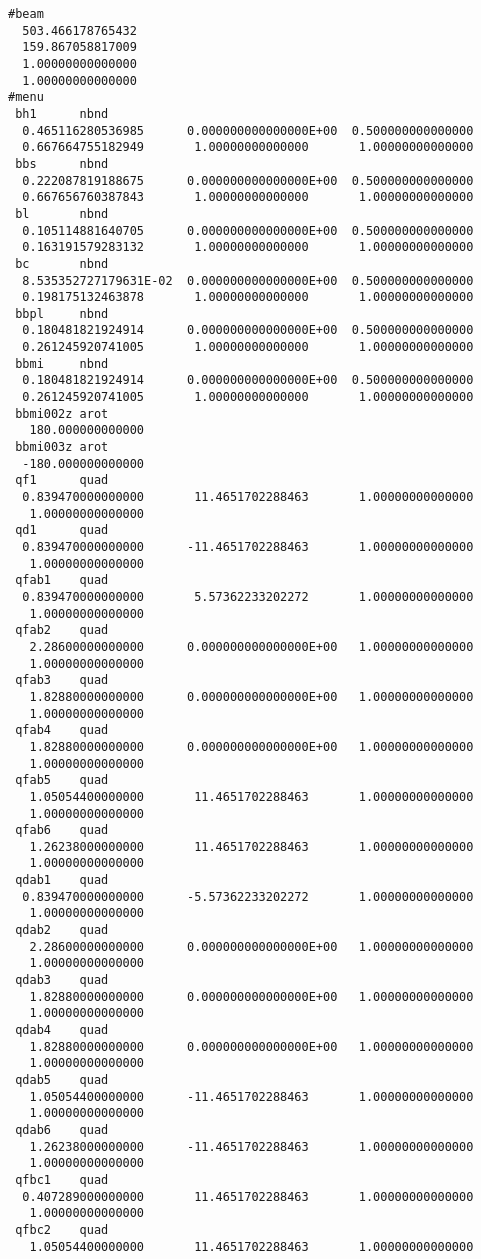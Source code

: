 \begin{footnotesize}
\begin{verbatim}
#beam
  503.466178765432
  159.867058817009
  1.00000000000000
  1.00000000000000
#menu
 bh1      nbnd
  0.465116280536985      0.000000000000000E+00  0.500000000000000
  0.667664755182949       1.00000000000000       1.00000000000000
 bbs      nbnd
  0.222087819188675      0.000000000000000E+00  0.500000000000000
  0.667656760387843       1.00000000000000       1.00000000000000
 bl       nbnd
  0.105114881640705      0.000000000000000E+00  0.500000000000000
  0.163191579283132       1.00000000000000       1.00000000000000
 bc       nbnd
  8.535352727179631E-02  0.000000000000000E+00  0.500000000000000
  0.198175132463878       1.00000000000000       1.00000000000000
 bbpl     nbnd
  0.180481821924914      0.000000000000000E+00  0.500000000000000
  0.261245920741005       1.00000000000000       1.00000000000000
 bbmi     nbnd
  0.180481821924914      0.000000000000000E+00  0.500000000000000
  0.261245920741005       1.00000000000000       1.00000000000000
 bbmi002z arot
   180.000000000000
 bbmi003z arot
  -180.000000000000
 qf1      quad
  0.839470000000000       11.4651702288463       1.00000000000000
   1.00000000000000
 qd1      quad
  0.839470000000000      -11.4651702288463       1.00000000000000
   1.00000000000000
 qfab1    quad
  0.839470000000000       5.57362233202272       1.00000000000000
   1.00000000000000
 qfab2    quad
   2.28600000000000      0.000000000000000E+00   1.00000000000000
   1.00000000000000
 qfab3    quad
   1.82880000000000      0.000000000000000E+00   1.00000000000000
   1.00000000000000
 qfab4    quad
   1.82880000000000      0.000000000000000E+00   1.00000000000000
   1.00000000000000
 qfab5    quad
   1.05054400000000       11.4651702288463       1.00000000000000
   1.00000000000000
 qfab6    quad
   1.26238000000000       11.4651702288463       1.00000000000000
   1.00000000000000
 qdab1    quad
  0.839470000000000      -5.57362233202272       1.00000000000000
   1.00000000000000
 qdab2    quad
   2.28600000000000      0.000000000000000E+00   1.00000000000000
   1.00000000000000
 qdab3    quad
   1.82880000000000      0.000000000000000E+00   1.00000000000000
   1.00000000000000
 qdab4    quad
   1.82880000000000      0.000000000000000E+00   1.00000000000000
   1.00000000000000
 qdab5    quad
   1.05054400000000      -11.4651702288463       1.00000000000000
   1.00000000000000
 qdab6    quad
   1.26238000000000      -11.4651702288463       1.00000000000000
   1.00000000000000
 qfbc1    quad
  0.407289000000000       11.4651702288463       1.00000000000000
   1.00000000000000
 qfbc2    quad
   1.05054400000000       11.4651702288463       1.00000000000000

\end{verbatim}
\end{footnotesize}

